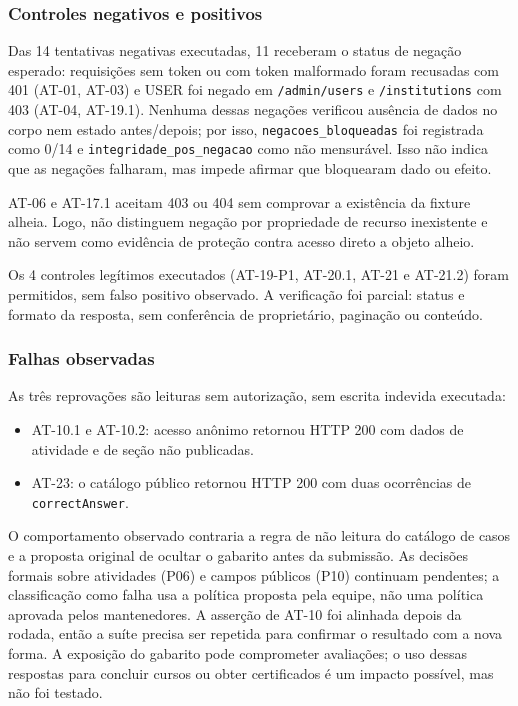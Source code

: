 \subsubsection{Controles negativos e
positivos}\label{controles-negativos-e-positivos}

Das 14 tentativas negativas executadas, 11 receberam o status de negação
esperado: requisições sem token ou com token malformado foram recusadas
com 401 (AT-01, AT-03) e USER foi negado em \texttt{/admin/\allowbreak{}users} e
\texttt{/institutions} com 403 (AT-04, AT-19.1). Nenhuma dessas negações
verificou ausência de dados no corpo nem estado antes/\allowbreak{}depois; por isso,
\texttt{negacoes\_bloqueadas} foi registrada como 0/14 e
\texttt{integridade\_pos\_negacao} como não mensurável. Isso não indica
que as negações falharam, mas impede afirmar que bloquearam dado ou
efeito.

AT-06 e AT-17.1 aceitam 403 ou 404 sem comprovar a existência da fixture
alheia. Logo, não distinguem negação por propriedade de recurso
inexistente e não servem como evidência de proteção contra acesso direto
a objeto alheio.

Os 4 controles legítimos executados (AT-19-P1, AT-20.1, AT-21 e AT-21.2)
foram permitidos, sem falso positivo observado. A verificação foi
parcial: status e formato da resposta, sem conferência de proprietário,
paginação ou conteúdo.

\subsubsection{Falhas observadas}\label{falhas-observadas}

As três reprovações são leituras sem autorização, sem escrita indevida
executada:

\begin{itemize}
\tightlist
\item
  AT-10.1 e AT-10.2: acesso anônimo retornou HTTP 200 com dados de
  atividade e de seção não publicadas.
\item
  AT-23: o catálogo público retornou HTTP 200 com duas ocorrências de
  \texttt{correctAnswer}.
\end{itemize}

O comportamento observado contraria a regra de não leitura do catálogo
de casos e a proposta original de ocultar o gabarito antes da submissão.
As decisões formais sobre atividades (P06) e campos públicos (P10)
continuam pendentes; a classificação como falha usa a política proposta
pela equipe, não uma política aprovada pelos mantenedores. A asserção de
AT-10 foi alinhada depois da rodada, então a suíte precisa ser repetida
para confirmar o resultado com a nova forma. A exposição do gabarito
pode comprometer avaliações; o uso dessas respostas para concluir cursos
ou obter certificados é um impacto possível, mas não foi testado.

